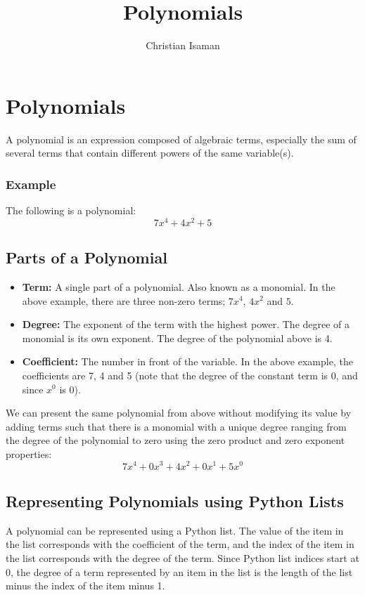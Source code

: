 \documentclass{article}
\title{Polynomials}
\author{Christian Isaman}
\date{}
\begin{document}
\maketitle

\section*{Polynomials}

A polynomial is an expression composed of algebraic terms, especially the sum of several terms that contain different powers of the same variable(s).

\subsubsection*{Example}
The following is a polynomial:
$$ 7x^4 + 4x^2 + 5 $$

\subsection*{Parts of a Polynomial}
\begin{itemize}
    \item \textbf{Term:} A single part of a polynomial. Also known as a monomial. In the above example, there are three non-zero terms; \( 7x^4 \), \( 4x^2 \) and \( 5 \).
    \item \textbf{Degree:} The exponent of the term with the highest power. The degree of a monomial is its own exponent. The degree of the polynomial above is 4.
    \item \textbf{Coefficient:} The number in front of the variable. In the above example, the coefficients are 7, 4 and 5 (note that the degree of the constant term is 0, and since \(x^0\) is 0).
\end{itemize}

We can present the same polynomial from above without modifying its value by adding terms such that there is a monomial with a unique degree ranging from the degree of the polynomial to zero using the zero product and zero exponent properties:
$$ 7x^4 + 0x^3 + 4x^2 + 0x^1 + 5x^0 $$

\subsection*{Representing Polynomials using Python Lists}

A polynomial can be represented using a Python list. The value of the item in the list corresponds with the coefficient of the term, and the index of the item in the list corresponds with the degree of the term. Since Python list indices start at 0, the degree of a term represented by an item in the list is the length of the list minus the index of the item minus 1.
\end{document}
